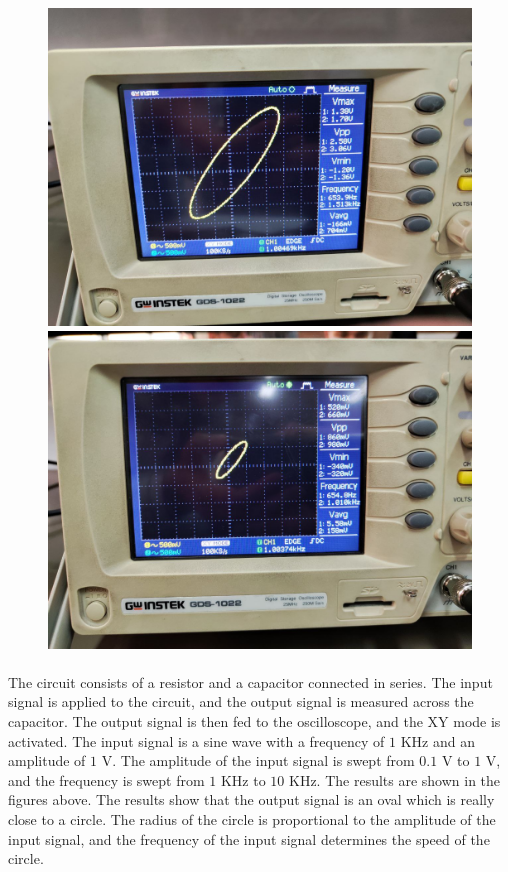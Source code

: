 \documentclass[11pt]{article}
\begin{document}
\begin{question}
{\begin{figure}[H]
\begin{center}
                \includegraphics[scale=0.15]{Fig/77.jpeg}
                \includegraphics[scale=0.15]{Fig/78.jpeg}
            \end{center}
        \end{figure}

        \paragraph*{}
        The circuit consists of a resistor and a capacitor connected in series. The input
        signal is applied to the circuit, and the output signal is measured across the
        capacitor. The output signal is then fed to the oscilloscope, and the XY mode is activated.
        The input signal is a sine wave with a frequency of $1$ KHz and an amplitude of $1$ V.
        The amplitude of the input signal is swept from $0.1$ V to $1$ V,
        and the frequency is swept from $1$ KHz to $10$ KHz. The results are shown in the figures above.
        The results show that the output signal is an oval which is really close to a circle.
        The radius of the circle is proportional to the amplitude of the input signal,
        and the frequency of the input signal determines the speed of the circle.

}
\end{question}
\end{document}
